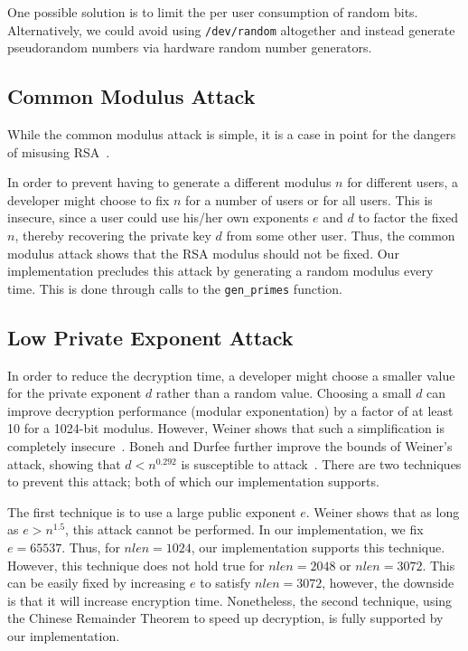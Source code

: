 \documentclass[a4paper]{article}
\begin{document}
One possible solution is to limit the per user consumption of random bits. Alternatively, we could avoid using {\tt /dev/random} altogether and instead generate pseudorandom numbers via hardware random number generators.

\subsection{Common Modulus Attack}
While the common modulus attack is simple, it is a case in point for the dangers of misusing RSA~\cite{boneh1999twenty}.

In order to prevent having to generate a different modulus $n$ for different users, a developer might choose to fix $n$ for a number of users or for all users. This is insecure, since a user could use his/her own exponents $e$ and $d$ to factor the fixed $n$, thereby recovering the private key $d$ from some other user. Thus, the common modulus attack shows that the RSA modulus should not be fixed. Our implementation precludes this attack by generating a random modulus every time.
This is done through calls to the {\tt gen\_primes} function.

\subsection{Low Private Exponent Attack}
In order to reduce the decryption time, a developer might choose a smaller value for the private exponent $d$ rather than a random value. Choosing a small $d$ can improve decryption performance (modular exponentation) by a factor of at least 10 for a 1024-bit modulus. However, Weiner shows that such a simplification is completely insecure~\cite{wiener1990cryptanalysis}. Boneh and Durfee further improve the bounds of Weiner's attack, showing that $d <
n^{0.292}$ is susceptible to attack~\cite{boneh2000new}. There are two techniques to prevent this attack; both of which our implementation supports. 

The first technique is to use a large public exponent $e$. Weiner shows that as long as $e > n^{1.5}$, this attack cannot be performed. In our implementation, we fix $e = 65537$. Thus, for $nlen = 1024$, our implementation supports this technique. However, this technique does not hold true for $nlen = 2048$ or $nlen = 3072$. This can be easily fixed by increasing $e$ to satisfy $nlen = 3072$, however, the downside is that it will increase encryption time. Nonetheless, the second technique, using
the Chinese Remainder Theorem to speed up decryption, is fully supported by our implementation.
\end{document}
